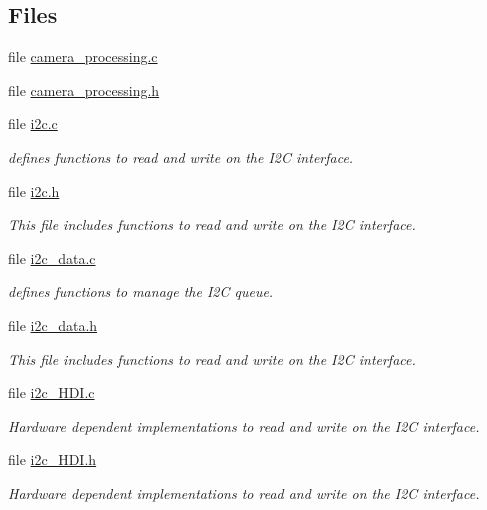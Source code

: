 \subsection*{Files}
\begin{DoxyCompactItemize}
\item 
file \hyperlink{camera__processing_8c}{camera\+\_\+processing.\+c}
\item 
file \hyperlink{camera__processing_8h}{camera\+\_\+processing.\+h}
\item 
file \hyperlink{i2c_8c}{i2c.\+c}
\begin{DoxyCompactList}\small\item\em defines functions to read and write on the I2\+C interface. \end{DoxyCompactList}\item 
file \hyperlink{i2c_8h}{i2c.\+h}
\begin{DoxyCompactList}\small\item\em This file includes functions to read and write on the I2\+C interface. \end{DoxyCompactList}\item 
file \hyperlink{i2c__data_8c}{i2c\+\_\+data.\+c}
\begin{DoxyCompactList}\small\item\em defines functions to manage the I2\+C queue. \end{DoxyCompactList}\item 
file \hyperlink{i2c__data_8h}{i2c\+\_\+data.\+h}
\begin{DoxyCompactList}\small\item\em This file includes functions to read and write on the I2\+C interface. \end{DoxyCompactList}\item 
file \hyperlink{i2c__HDI_8c}{i2c\+\_\+\+H\+D\+I.\+c}
\begin{DoxyCompactList}\small\item\em Hardware dependent implementations to read and write on the I2\+C interface. \end{DoxyCompactList}\item 
file \hyperlink{i2c__HDI_8h}{i2c\+\_\+\+H\+D\+I.\+h}
\begin{DoxyCompactList}\small\item\em Hardware dependent implementations to read and write on the I2\+C interface. \end{DoxyCompactList}\end{DoxyCompactItemize}



